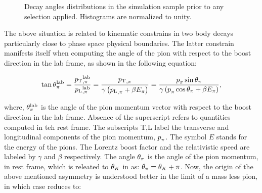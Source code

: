 \begin{figure}[t]
  \centering
  \begin{subfigure}{0.33\textwidth}
    \scalebox{0.7}{}
    \caption{}
    \label{angDistr_ctk}
  \end{subfigure}%
  \hfill%
  \begin{subfigure}{0.33\textwidth}
    \scalebox{0.7}{}
    \caption{}
    \label{angDistr_ctl}
  \end{subfigure}%
  \hfill%
  \begin{subfigure}{0.33\textwidth}
    \scalebox{0.7}{}
    \caption{}
    \label{angDistr_phi}
  \end{subfigure}
  \caption{Decay angles distributions in the simulation sample prior to any selection applied. Histograms are normalized to unity.}
  \label{angDistr_all}
\end{figure}

The above situation is related to kinematic constrains in two body decays particularly close to phase
space physical boundaries. The latter constrain manifests itself when computing the angle of the pion
with respect to the boost direction in the lab frame, as shown in the following equation:

\begin{equation}
  \centering
  \tan\thetapi^\lab = \frac{\ptrans{\pi}^\lab}{\plongd{\pi}^\lab}
               = \frac{\ptrans{\pi}}{\gamma\parenthesis{\plongd{\pi} + \beta E_\pi} }
               = \frac{\ptot_{\pi} \sin\thetapi}{\gamma\parenthesis{\ptot_{\pi} \cos\thetapi + \beta E_\pi} },
  \label{pi_angle}
\end{equation}

\noindent where, $\theta_{\pi}^{\rm lab}$ is the angle of the pion momentum vector with respect to the boost direction
in the lab frame. Absence of the \lab superscript refers to quantities computed in teh \Kstarz rest frame.
The subscripts T,L label the transverse and longitudinal components of the pion momentum, $\mbox{$p$}_{\pi}$.
The symbol $E$ stands for the energy of the pions. The Lorentz boost factor and the relativistic speed
are labeled by $\gamma$ and $\beta$ respectively. The angle $\theta_{\pi}$ is the angle of the pion momentum,
in \Kstarz rest frame, which is releated to $\theta_{K}$ in  as: $\theta_{\pi} = \theta_{K} + \pi$.
Now, the origin of the above mentioned asymmetry is understood better in the limit of a mass less pion,
in which case  reduces to:

